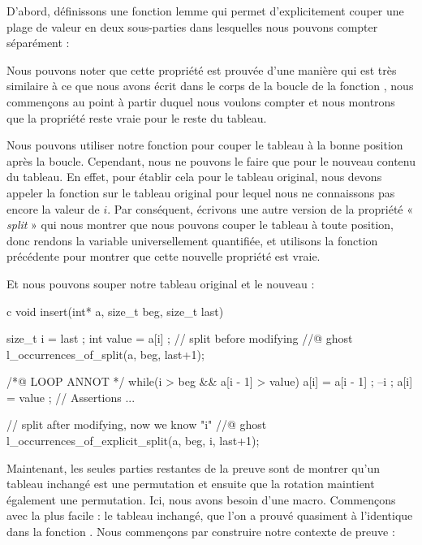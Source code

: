 D'abord, définissons une fonction lemme qui permet d'explicitement
couper une plage de valeur en deux sous-parties dans lesquelles nous pouvons
compter séparément :




Nous pouvons noter que cette propriété est prouvée d'une manière qui est très
similaire à ce que nous avons écrit dans le corps de la boucle de la fonction
, nous commençons au point à partir duquel nous
voulons compter et nous montrons que la propriété reste vraie pour le reste
du tableau.


Nous pouvons utiliser notre fonction pour couper le tableau à la bonne position
après la boucle. Cependant, nous ne pouvons le faire que pour le nouveau contenu
du tableau. En effet, pour établir cela pour le tableau original, nous devons 
appeler la fonction sur le tableau original pour lequel nous ne connaissons pas
encore la valeur de $i$. Par conséquent, écrivons une autre version de la 
propriété « \textit{split} » qui nous montrer que nous pouvons couper le tableau à toute
position, donc rendons la variable  universellement quantifiée,
et utilisons la fonction précédente pour montrer que cette nouvelle propriété est
vraie.




Et nous pouvons souper notre tableau original et le nouveau :


\begin{CodeBlock}{c}
void insert(int* a, size_t beg, size_t last){
  size_t i = last ;
  int value = a[i] ;
  // split before modifying
  //@ ghost l_occurrences_of_split(a, beg, last+1);

  /*@ LOOP ANNOT */
  while(i > beg && a[i - 1] > value){
    a[i] = a[i - 1] ;
    --i ;
  }
  a[i] = value ;
  // Assertions ...

  // split after modifying, now we know "i"
  //@ ghost l_occurrences_of_explicit_split(a, beg, i, last+1);
}
\end{CodeBlock}


Maintenant, les seules parties restantes de la preuve sont de montrer qu'un tableau
inchangé est une permutation et ensuite que la rotation maintient également une
permutation. Ici, nous avons besoin d'une macro. Commençons avec la plus facile :
le tableau inchangé, que l'on a prouvé quasiment à l'identique dans la fonction
. Nous commençons par construire notre contexte de
preuve :


